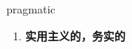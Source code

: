 
\begin{frame}
{\huge pragmatic}
\begin{center}
\begin{enumerate}\Large
  \item \textbf{实用主义的，务实的}
\end{enumerate}
\end{center}
\end{frame}
